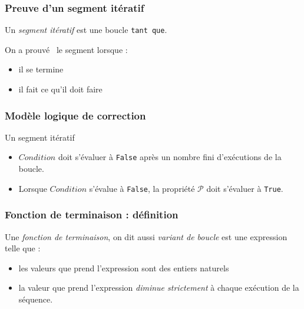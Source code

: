 



\begin{frame}
  \frametitle{Preuve d'un segment itératif}
Un \emph{segment itératif} est une boucle \texttt{tant que}.

On a \og prouvé\fg~ le segment lorsque :
\begin{itemize}
  \item il se termine
  \item il fait ce qu'il doit faire
\end{itemize}
\end{frame}

\begin{frame}
  \frametitle{Modèle logique de correction}
\begin{algorithm}[H]
  \caption{Un segment itératif}
  \label{corsegit_1}
\end{algorithm}
\begin{itemize}
  \item $Condition$ doit s'évaluer à \texttt{False} après un nombre fini d'exécutions de la boucle.
  \item Lorsque $Condition$ s'évalue à \texttt{False}, la propriété $\mathcal{P}$ doit s'évaluer à \texttt{True}.
\end{itemize}
\end{frame}

\begin{frame}
  \frametitle{Fonction de terminaison : définition}
\begin{defi}
Une \emph{fonction de terminaison}, on dit aussi \emph{variant de boucle} est une expression telle que :
\begin{itemize}                                                                                                                                                                                                                                               \item les valeurs que prend l'expression sont des entiers naturels
\item la valeur que prend l'expression \emph{diminue strictement} à chaque exécution de la séquence.                                                                                                                                                                                                                             \end{itemize}
\end{defi}
\end{frame}

